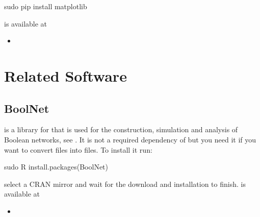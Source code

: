 \documentclass[letterpaper,10pt,english]{sphinxmanual}
\begin{document}
\begin{sphinxVerbatim}[commandchars=\\\{\}]
\PYGZdl{} sudo pip install matplotlib
\end{sphinxVerbatim}

 is available at
\begin{itemize}
\item {} 

\end{itemize}


\section{Related Software}
\label{\detokenize{Installation:related-software}}

\subsection{BoolNet}
\label{\detokenize{Installation:boolnet}}\label{\detokenize{Installation:installation-boolnet}}
 is a library for  that is used for the construction, simulation and analysis of Boolean networks, see {\hyperref[\detokenize{Bibliography:mussel2010}]{}}.
It is not a required dependency of  but you need it if you want to convert  files into  files.
To install it run:

\begin{sphinxVerbatim}[commandchars=\\\{\}]
\PYGZdl{} sudo R
\PYGZgt{} install.packages(\PYGZdq{}BoolNet\PYGZdq{})
\end{sphinxVerbatim}

select a CRAN mirror and wait for the download and installation to finish.
 is available at
\begin{itemize}
\item {} 

\end{itemize}
\end{document}
